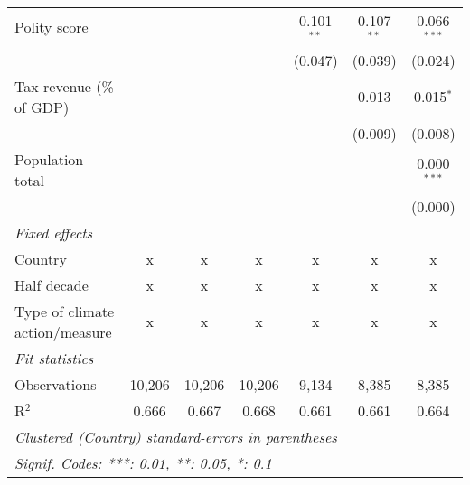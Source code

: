 \begin{tabular}{lcccccc}
   Polity score                                                        &               &              &                & 0.101$^{**}$   & 0.107$^{**}$   & 0.066$^{***}$\\   
                                                                       &               &              &                & (0.047)        & (0.039)        & (0.024)\\   
   Tax revenue (\% of GDP)                                             &               &              &                &                & 0.013          & 0.015$^{*}$\\   
                                                                       &               &              &                &                & (0.009)        & (0.008)\\   
   Population total                                                    &               &              &                &                &                & 0.000$^{***}$\\   
                                                                       &               &              &                &                &                & (0.000)\\   
   \emph{Fixed effects}\\
   Country                                                             & x             & x            & x              & x              & x              & x\\  
   Half decade                                                         & x             & x            & x              & x              & x              & x\\  
   Type of climate action/measure                                      & x             & x            & x              & x              & x              & x\\  
   \midrule \emph{Fit statistics}\\
   Observations                                                        & 10,206        & 10,206       & 10,206         & 9,134          & 8,385          & 8,385\\  
   R$^2$                                                               & 0.666         & 0.667        & 0.668          & 0.661          & 0.661          & 0.664\\  
   \midrule
   \multicolumn{7}{l}{\emph{Clustered (Country) standard-errors in parentheses}}\\
   \multicolumn{7}{l}{\emph{Signif. Codes: ***: 0.01, **: 0.05, *: 0.1}}\\
\end{tabular}
\par\endgroup



